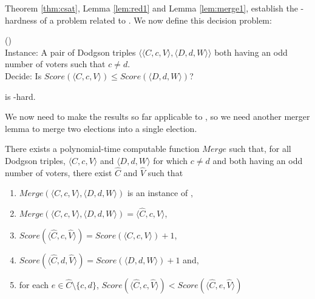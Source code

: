 Theorem \ref{thm:csat}, Lemma \ref{lem:red1} and Lemma
\ref{lem:merge1}, establish the \tp-hardness of a problem related to
. We now define this decision problem:

\begin{problem}{ ()} \\
    \tab Instance: A pair of Dodgson triples
$\langle \langle C,c,V \rangle, \langle D,d,W \rangle \rangle$
both having an odd number of voters such that $c\neq d$.\\
    \tab Decide: Is 
$Score(\langle C,c,V \rangle)\leq Score(\langle D,d,W \rangle)$?
\end{problem}

\begin{lemma} \label{lem:2er}
     is \tp-hard.
\end{lemma}

We now need to make the results so far applicable to 
, so we need another merger lemma to
merge two elections into a single election.

\begin{lemma} \label{lem:merge2}
There exists a polynomial-time computable function $Merge$
    such that, for all Dodgson triples,
    $\langle C,c,V \rangle$ and $\langle D,d,W \rangle$ 
    for which $c\neq d$ and both having an odd number of voters,
    there exist $\hat{C}$ and $\hat{V}$ such that
    \begin{enumerate}
        \item $Merge(\langle C,c,V \rangle, \langle D,d,W \rangle)$
        is an instance of , 
        \item $Merge(\langle C,c,V \rangle, \langle D,d,W \rangle)
        = \langle \hat{C},c,\hat{V} \rangle$,
        \item $Score(\langle \hat{C},c,\hat{V} \rangle) =
        Score(\langle C,c,V \rangle) + 1$,
        \item $Score(\langle \hat{C},d,\hat{V} \rangle) =
        Score(\langle D,d,W \rangle) + 1$ and,
        \item for each $e \in \hat{C}\setminus \{c,d\}$, 
        $Score(\langle \hat{C},c,\hat{V} \rangle) < 
        Score(\langle \hat{C},e,\hat{V} \rangle)$
    \end{enumerate}
\end{lemma}



